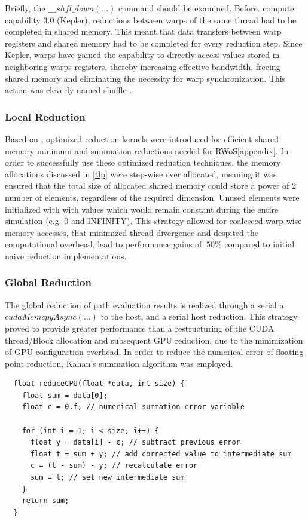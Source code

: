 Briefly, the $\_\_\_shfl\_down(...)$ command should be examined. Before, compute capability
3.0 (Kepler), reductions between warps of the same thread had to be completed in
shared memory.  This meant that data transfers between warp registers and shared
memory had to be completed for every reduction step.  Since Kepler, warps have gained
the capability to directly access values stored in neighboring warps registers,
thereby increasing effective bandwidth, freeing shared memory and eliminating the
necessity for warp synchronization. This action was cleverly named shuffle \cite{shuffle}.
\subsubsection{Local Reduction}\label{localRed}
Based on \cite{harris}, optimized reduction kernels were introduced for efficient
shared memory minimum and summation reductions needed for \Gls{RWoS}\ref{appendix}.
In order to successfully use these optimized reduction techniques, the memory allocations
discussed in \ref{tlp} were step-wise over allocated, meaning it was ensured that
the total size of allocated shared memory could store a power of 2 number of elements,
regardless of the required dimension.  Unused elements were initialized with with
values which would remain constant during the entire simulation (e.g. 0 and INFINITY).
This strategy allowed for coalesced warp-wise memory accesses, that minimized
thread divergence and despited the computational overhead, lead to performance gains
of $~50\%$ compared to initial naive reduction implementations.
\subsubsection{Global Reduction}
The global reduction of path evaluation results is realized through a serial
a $cudaMemcpyAsync(...)$ to the host, and a serial host reduction.  This strategy
proved to provide greater performance than a restructuring of the CUDA thread/Block
allocation and subsequent GPU reduction, due to the minimization of GPU configuration
overhead.  In order to reduce the numerical error of floating point reduction,
Kahan's summation algorithm was employed.
\begin{lstlisting}
  float reduceCPU(float *data, int size) {
    float sum = data[0];
    float c = 0.f; // numerical summation error variable

    for (int i = 1; i < size; i++) {
      float y = data[i] - c; // subtract previous error
      float t = sum + y; // add corrected value to intermediate sum
      c = (t - sum) - y; // recalculate error
      sum = t; // set new intermediate sum
    }
    return sum;
  }
\end{lstlisting}


